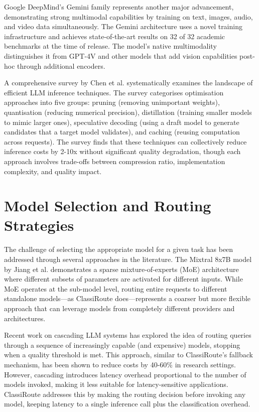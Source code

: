 \documentclass[oneside,12pt,a4paper]{report}
\begin{document}
Google DeepMind's Gemini family \cite{gemini} represents another major advancement, demonstrating strong multimodal capabilities by training on text, images, audio, and video data simultaneously. The Gemini architecture uses a novel training infrastructure and achieves state-of-the-art results on 32 of 32 academic benchmarks at the time of release. The model's native multimodality distinguishes it from GPT-4V and other models that add vision capabilities post-hoc through additional encoders.

A comprehensive survey by Chen et al. \cite{chen2024efficientllm} systematically examines the landscape of efficient LLM inference techniques. The survey categorises optimisation approaches into five groups: pruning (removing unimportant weights), quantisation (reducing numerical precision), distillation (training smaller models to mimic larger ones), speculative decoding (using a draft model to generate candidates that a target model validates), and caching (reusing computation across requests). The survey finds that these techniques can collectively reduce inference costs by 2-10x without significant quality degradation, though each approach involves trade-offs between compression ratio, implementation complexity, and quality impact.

\section{Model Selection and Routing Strategies}

The challenge of selecting the appropriate model for a given task has been addressed through several approaches in the literature. The Mixtral 8x7B model by Jiang et al. \cite{jiang2023mixtral} demonstrates a sparse mixture-of-experts (MoE) architecture where different subsets of parameters are activated for different inputs. While MoE operates at the sub-model level, routing entire requests to different standalone models---as ClassiRoute does---represents a coarser but more flexible approach that can leverage models from completely different providers and architectures.

Recent work on cascading LLM systems has explored the idea of routing queries through a sequence of increasingly capable (and expensive) models, stopping when a quality threshold is met. This approach, similar to ClassiRoute's fallback mechanism, has been shown to reduce costs by 40-60\% in research settings. However, cascading introduces latency overhead proportional to the number of models invoked, making it less suitable for latency-sensitive applications. ClassiRoute addresses this by making the routing decision before invoking any model, keeping latency to a single inference call plus the classification overhead.
\end{document}
